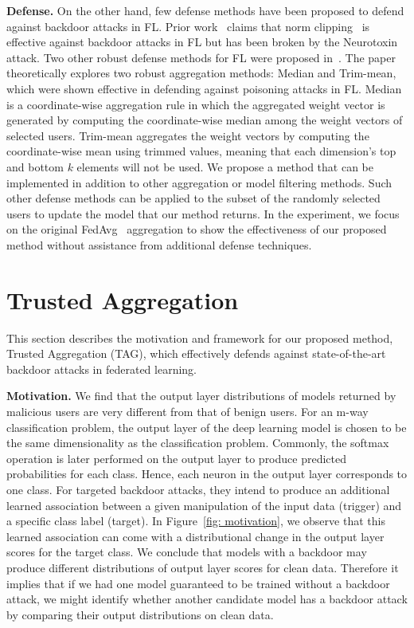 \documentclass{article} %
\begin{document}
\textbf{Defense.} On the other hand, few defense methods have been proposed to defend against backdoor attacks in FL. Prior work~\citep{shejwalkar2022back} claims that norm clipping~\citep{sun2019can} is effective against backdoor attacks in FL but has been broken by the Neurotoxin attack. Two other robust defense methods for FL were proposed in~\cite{trim-mean}. The paper theoretically explores two robust aggregation methods: Median and Trim-mean, which were shown effective in defending against poisoning attacks in FL. Median is a coordinate-wise aggregation rule in which the aggregated weight vector is generated by computing the coordinate-wise median among the weight vectors of selected users. Trim-mean aggregates the weight vectors by computing the coordinate-wise mean using trimmed values, meaning that each dimension's top and bottom $k$ elements will not be used. We propose a method that can be implemented in addition to other aggregation or model filtering methods. Such other defense methods can be applied to the subset of the randomly selected users to update the model that our method returns. In the experiment, we focus on the original FedAvg~\citep{fedavg} aggregation to show the effectiveness of our proposed method without assistance from additional defense techniques. 


\vspace{-5pt}
\section{Trusted Aggregation}
\label{sec: methodology}
\vspace{-5pt}

This section describes the motivation and framework for our proposed method, Trusted Aggregation (TAG), which effectively defends against state-of-the-art backdoor attacks in federated learning. 

\textbf{Motivation.} We find that the output layer distributions of models returned by malicious users are very different from that of benign users. For an m-way classification problem, the output layer of the deep learning model is chosen to be the same dimensionality as the classification problem. Commonly, the softmax operation is later performed on the output layer to produce predicted probabilities for each class. Hence, each neuron in the output layer corresponds to one class. For targeted backdoor attacks, they intend to produce an additional learned association between a given manipulation of the input data (trigger) and a specific class label (target). In Figure~\ref{fig: motivation}, we observe that this learned association can come with a distributional change in the output layer scores for the target class. We conclude that models with a backdoor may produce different distributions of output layer scores for clean data. Therefore it implies that if we had one model guaranteed to be trained without a backdoor attack, we might identify whether another candidate model has a backdoor attack by comparing their output distributions on clean data.
\end{document}
